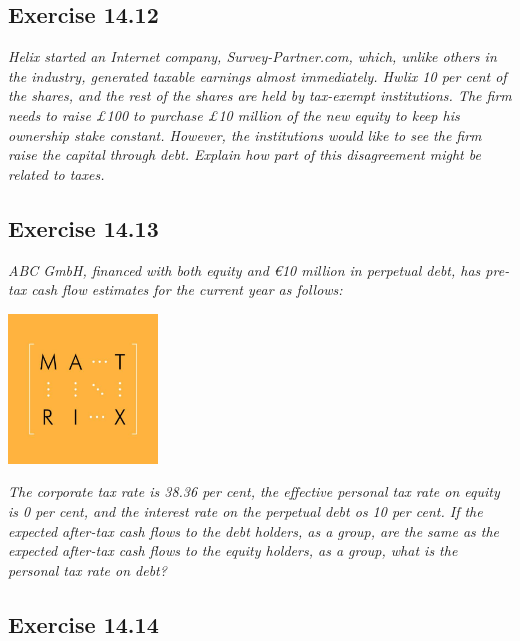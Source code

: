 \documentclass[]{book}
\newcommand{\euro}{€}
\theoremstyle{definition}
\theoremstyle{definition}
\theoremstyle{remark}
\begin{document}
\subsection{Exercise 14.12}\label{exercise-14.12}

\emph{Helix started an Internet company, Survey-Partner.com, which,
unlike others in the industry, generated taxable earnings almost
immediately. Hwlix 10 per cent of the shares, and the rest of the shares
are held by tax-exempt institutions. The firm needs to raise £100 to
purchase £10 million of the new equity to keep his ownership stake
constant. However, the institutions would like to see the firm raise the
capital through debt. Explain how part of this disagreement might be
related to taxes.} \citep[p.493]{book}

\subsection{Exercise 14.13}\label{exercise-14.13}

\emph{ABC GmbH, financed with both equity and \euro{}10 million in
perpetual debt, has pre-tax cash flow estimates for the current year as
follows:} \citep[p.493]{book}

\begin{center}\includegraphics[width=150px]{figures/matrix} \end{center}

\emph{The corporate tax rate is 38.36 per cent, the effective personal
tax rate on equity is 0 per cent, and the interest rate on the perpetual
debt os 10 per cent. If the expected after-tax cash flows to the debt
holders, as a group, are the same as the expected after-tax cash flows
to the equity holders, as a group, what is the personal tax rate on
debt?} \citep[p.494]{book}

\subsection{Exercise 14.14}\label{exercise-14.14}
\end{document}
